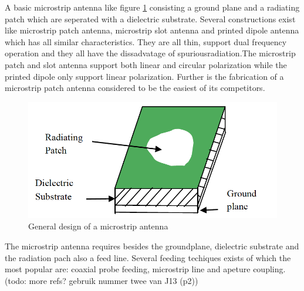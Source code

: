 A basic microstrip antenna like figure \ref{fig:basicpatchantenna} consisting a ground plane and
a radiating patch which are seperated with a dielectric substrate. Several constructions exist like microstrip patch antenna, microstrip slot antenna and printed dipole antenna which
has all similar characteristics. They are all thin, support dual frequency operation and they all have the dissadvatage of \gls{spuriousradiation}.The microstrip patch and slot antenna support both linear
and circular polarization while the printed dipole only support linear polarization. Further is the fabrication of a microstrip patch antenna considered to be the easiest of its competitors. 



\begin{figure}[H]
  \includegraphics[width=\textwidth/2]{../images/patchantenna.png}
  \caption{General design of a microstrip antenna}
  \label{fig:basicpatchantenna}
\end{figure}


The microstrip antenna requires besides the groundplane, dielectric substrate and the radiation pach also a feed line. Several feeding techiques exists of which the most popular are: coaxial probe feeding, microstrip line and apeture coupling. %
(todo: more refs? gebruik nummer twee van J13 (p2))

